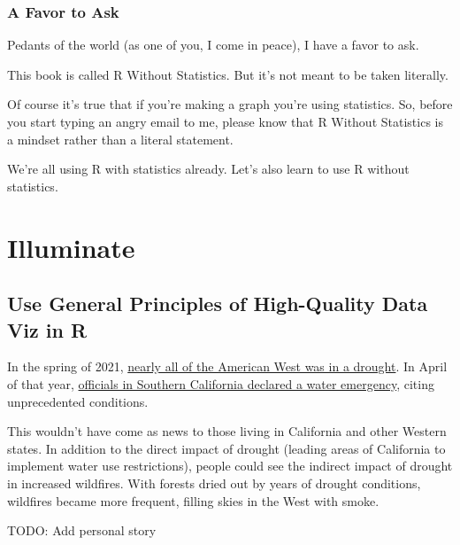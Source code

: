\documentclass[
]{book}
\begin{document}
\hypertarget{a-favor-to-ask}{%
\section*{A Favor to Ask}\label{a-favor-to-ask}}

Pedants of the world (as one of you, I come in peace), I have a favor to ask.

This book is called R Without Statistics. But it's not meant to be taken literally.

Of course it's true that if you're making a graph you're using statistics. So, before you start typing an angry email to me, please know that R Without Statistics is a mindset rather than a literal statement.

We're all using R with statistics already. Let's also learn to use R without statistics.

\hypertarget{part-illuminate}{%
\part*{Illuminate}\label{part-illuminate}}

\hypertarget{use-general-principles-of-high-quality-data-viz-in-r}{%
\chapter*{Use General Principles of High-Quality Data Viz in R}\label{use-general-principles-of-high-quality-data-viz-in-r}}

In the spring of 2021, \href{https://droughtmonitor.unl.edu/DmData/TimeSeries.aspx}{nearly all of the American West was in a drought}. In April of that year, \href{https://www.cbsnews.com/news/west-climate-change-water/}{officials in Southern California declared a water emergency}, citing unprecedented conditions.

This wouldn't have come as news to those living in California and other Western states. In addition to the direct impact of drought (leading areas of California to implement water use restrictions), people could see the indirect impact of drought in increased wildfires. With forests dried out by years of drought conditions, wildfires became more frequent, filling skies in the West with smoke.

TODO: Add personal story
\end{document}
